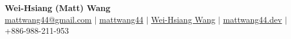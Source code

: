 \documentclass[letterpaper,11pt]{article}
\begin{document}

\begin{center}
  \textbf{\Large Wei-Hsiang (Matt) Wang} \\
  \vspace{8px}
  \href{mailto:mattwang44@gmail.com}{\faEnvelope \hspace{1px} mattwang44@gmail.com} {{$\vert$}}
  \href{https://github.com/mattwang44/}{\faGithub \hspace{1px} mattwang44} {{$\vert$}}
  \href{https://www.linkedin.com/in/weihsiang-wang/}{\faLinkedin \hspace{1px} Wei-Hsiang Wang} {{$\vert$}}
  \href{https://mattwang44.dev/}{ \faPenSquare \hspace{1px} mattwang44.dev} {{$\vert$}}
  { \faPhoneSquare \hspace{1px} +886-988-211-953}
\end{center}

\vspace{-4px}
\end{document}
